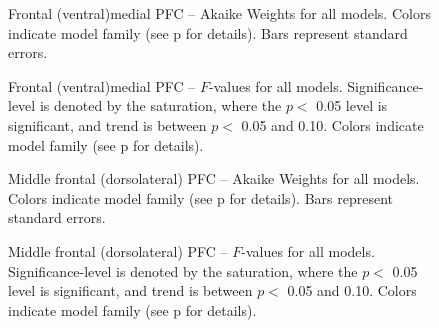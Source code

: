 \begin{figure}[tp]
    \centering
    \caption{Frontal (ventral)medial PFC -- Akaike Weights for all models.  Colors indicate model family (see p\pageref{sub:cmb} for details). Bars represent standard errors.}
    \label{fig:vmpfc}
\end{figure}
\begin{figure}[tp]
    \centering
    \caption{Frontal (ventral)medial PFC -- $F$-values for all models.
    Significance-level is denoted by the saturation, where the $p <$ 0.05 level is
    significant, and trend is between $p <$ 0.05 and 0.10.  Colors indicate model family (see p\pageref{sub:cmb} for details).}
    \label{fig:fvalvmpfc}
\end{figure}

\begin{figure}[tp]
    \centering
    \caption{Middle frontal (dorsolateral) PFC -- Akaike Weights for all models.  Colors indicate model family (see p\pageref{sub:cmb} for details). Bars represent standard errors.}
    \label{fig:dlpfc}
\end{figure}
\begin{figure}[tp]
    \centering
    \caption{Middle frontal (dorsolateral) PFC -- $F$-values for all models.
    Significance-level is denoted by the saturation, where the $p <$ 0.05 level is
    significant, and trend is between $p <$ 0.05 and 0.10.  Colors indicate model family (see p\pageref{sub:cmb} for details).}
    \label{fig:fvaldlpfc}
\end{figure}
\clearpage